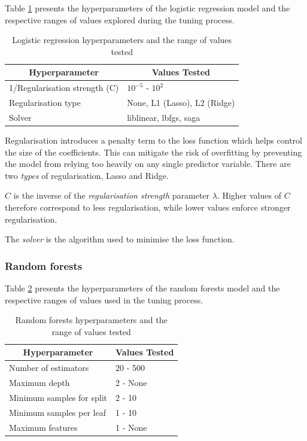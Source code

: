 Table \ref{tab:lr_params} presents the hyperparameters of the logistic regression model and the respective ranges of values explored during the tuning process.

\begin{table}[h]
	\centering
	\begin{tabular}{ll}
		\toprule
		\multicolumn{1}{c}{\textbf{Hyperparameter}} & \multicolumn{1}{c}{\textbf{Values Tested}} \\
		\midrule
		1/Regularisation strength (C)              & $10^{-5}$ - $10^{2}$ \\
		Regularisation type                       & None, L1 (Lasso), L2 (Ridge) \\
		Solver                                    & liblinear, lbfgs, saga \\
		\bottomrule
	\end{tabular}
	\caption{Logistic regression hyperparameters and the range of values tested}
	\label{tab:lr_params}
\end{table}

Regularisation introduces a penalty term to the loss function which helps control the size of the coefficients. This can mitigate the risk of overfitting by preventing the model from relying too heavily on any single predictor variable. There are two \textit{types} of regularisation, Lasso and Ridge.

$C$ is the inverse of the \textit{regularisation strength} parameter $\lambda$. Higher values of $C$ therefore correspond to less regularisation, while lower values enforce stronger regularisation.

The \textit{solver} is the algorithm used to minimise the loss function. 

\subsubsection{Random forests}

Table \ref{tab:rf_params} presents the hyperparameters of the random forests model and the respective ranges of values used in the tuning process.

\begin{table}[h]
	\centering
	\begin{tabular}{ll}
		\toprule
		\multicolumn{1}{c}{\textbf{Hyperparameter}} & \multicolumn{1}{c}{\textbf{Values Tested}} \\
		\midrule
		Number of estimators       & 20 - 500 \\
		Maximum depth              & 2 - None \\
		Minimum samples for split  & 2 - 10 \\
		Minimum samples per leaf   & 1 - 10 \\
		Maximum features           & 1 - None \\
		\bottomrule
	\end{tabular}
	\caption{Random forests hyperparameters and the range of values tested}
	\label{tab:rf_params}
\end{table}

